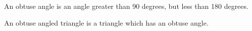 An obtuse angle is an angle greater than 90 degrees, but less than 
180 degrees.
\par
An obtuse angled triangle is a triangle which has an obtuse angle.